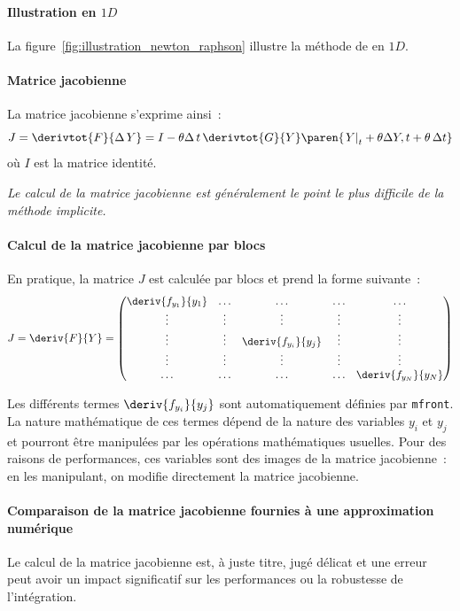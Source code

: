\documentclass[rectoverso,pleiades,pstricks,leqno,anti]{texmf/note_technique_2010}
\newcommand{\mfront}{\texttt{mfront}}
\newcommand{\debutpas}[1]{\ensuremath{\left.#1\right|_{t}}}
\begin{document}
\paragraph{Illustration en \(1D\)} La
figure~\ref{fig:illustration_newton_raphson} illustre la méthode de
 en $1D$.

\paragraph{Matrice jacobienne}
La matrice jacobienne s'exprime ainsi~:
\begin{equation}
  \label{eq:J_implicite}
  J = \derivtot{F}{\Delta\,Y} = I-\theta\Delta\,t\,\derivtot{G}{Y}\paren{\debutpas{Y}+\theta\Delta{Y},t+\theta\,\Delta t}
\end{equation}
où \(I\) est la matrice identité. 

{\em Le calcul de la matrice jacobienne est généralement le point le
  plus difficile de la méthode implicite.}

\paragraph{Calcul de la matrice jacobienne par blocs} En pratique, la
matrice \(J\) est calculée par blocs et prend la forme suivante~:
\[
J = \deriv{F}{Y} =
\begin{pmatrix}
  \deriv{f_{y_{1}}}{y_{1}} & \ldots & \ldots & \ldots & \ldots \\
  \vdots & \vdots & \vdots & \vdots & \vdots \\
  \vdots & \vdots & \deriv{f_{y_{i}}}{y_{j}} & \vdots & \vdots \\
  \vdots & \vdots & \vdots & \vdots & \vdots \\
  \ldots & \ldots & \ldots & \ldots & \deriv{f_{y_{N}}}{y_{N}} \\
\end{pmatrix}
\]

Les différents termes \(\deriv{f_{y_{i}}}{y_{j}}\) sont automatiquement
définies par \mfront{}. La nature mathématique de ces termes dépend de
la nature des variables \(y_{i}\) et \(y_{j}\) et pourront être
manipulées par les opérations mathématiques usuelles. Pour des raisons
de performances, ces variables sont des images de la matrice
jacobienne~: en les manipulant, on modifie directement la matrice
jacobienne.

\paragraph{Comparaison de la matrice jacobienne fournies à une
  approximation numérique} Le calcul de la matrice jacobienne est, à
juste titre, jugé délicat et une erreur peut avoir un impact
significatif sur les performances ou la robustesse de l'intégration.
\end{document}
